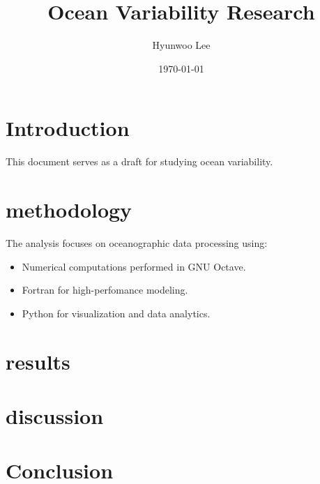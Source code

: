 \documentclass{article}
\title{Ocean Variability Research}
\author{Hyunwoo Lee}
\date{\today}
\begin{document}
\maketitle

\section{Introduction}
This document serves as a draft for studying ocean variability.

\section{methodology}
The analysis focuses on oceanographic data processing using:
\begin{itemize}
    \item Numerical computations performed in  GNU Octave.
    \item Fortran for high-perfomance modeling.
    \item Python for visualization and data analytics.
\end{itemize}

\section{results}

\section{discussion}

\section{Conclusion}
\end{document}
